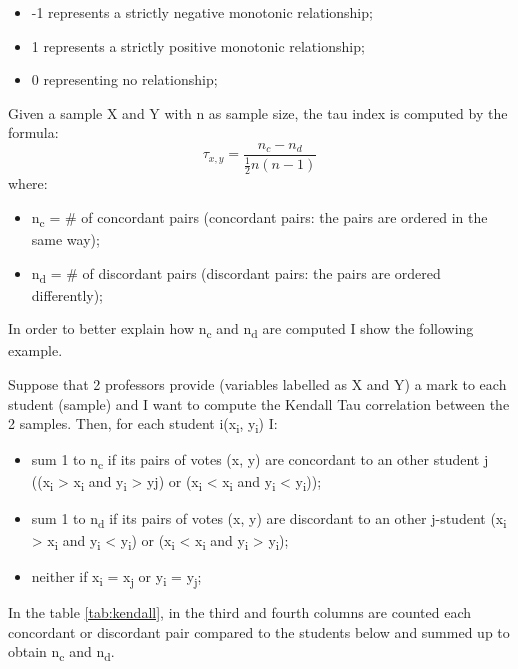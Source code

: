 \begin{itemize}
\item -1 represents a strictly negative monotonic relationship;
\item 1 represents a strictly positive monotonic relationship;
\item 0 representing no relationship;
\end{itemize}
Given a sample X and Y with n as sample size, the tau index is computed by the formula:
\begin{equation}
  \tau_{x,y} = \frac{n_c-n_d}{\frac{1}{2}n(n-1)}
\end{equation}
where:
\begin{itemize}
\item n\textsubscript{c} = \# of concordant pairs (concordant pairs: the pairs are ordered in the same way);
\item n\textsubscript{d} = \# of discordant pairs (discordant pairs: the pairs are ordered differently);
\end{itemize}
In order to better explain how n\textsubscript{c} and n\textsubscript{d} are computed I show the following example. \par
Suppose that 2 professors provide (variables labelled as X and Y) a mark to each student (sample) and I want to compute the Kendall Tau correlation between the 2 samples. 
Then, for each student i(x\textsubscript{i}, y\textsubscript{i}) I:
\begin{itemize}
    \item sum 1 to n\textsubscript{c} if its pairs of votes (x, y) are concordant to an other student j ((x\textsubscript{i} > x\textsubscript{i} and y\textsubscript{i} > yj) or (x\textsubscript{i} < x\textsubscript{i} and y\textsubscript{i} < y\textsubscript{i}));
    \item sum 1 to n\textsubscript{d} if its pairs of votes (x, y) are discordant to an other j-student (x\textsubscript{i} > x\textsubscript{i} and y\textsubscript{i} < y\textsubscript{i}) or (x\textsubscript{i} < x\textsubscript{i} and y\textsubscript{i} > y\textsubscript{i});
    \item neither if x\textsubscript{i} = x\textsubscript{j} or y\textsubscript{i} = y\textsubscript{j};
\end{itemize} 
In the table \ref{tab:kendall}, in the third and fourth columns are counted each concordant or discordant pair compared to the students below and summed up to obtain n\textsubscript{c} and n\textsubscript{d}.
